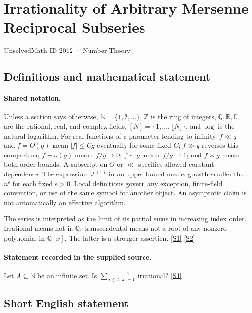 \documentclass[11pt,a4paper]{article}
\newcommand{\N}{\mathbb{N}}
\newcommand{\Z}{\mathbb{Z}}
\newcommand{\Q}{\mathbb{Q}}
\newcommand{\R}{\mathbb{R}}
\newcommand{\C}{\mathbb{C}}
\newcommand{\sref}[2]{\hyperlink{source:#1:#2}{[S#2]}}
\begin{document}

\setcounter{section}{2011}

\section{Irrationality of Arbitrary Mersenne Reciprocal Subseries}\label{2012}

{\small\sffamily UnsolvedMath ID 2012 · Number Theory}

\subsection{Definitions and mathematical statement}

\paragraph{Shared notation.}Unless a section says otherwise, $\N=\{1,2,\ldots\}$,
$\Z$ is the ring of integers, $\Q,\R,\C$ are the rational, real, and complex
fields, $[N]=\{1,\ldots,\lfloor N\rfloor\}$, and $\log$ is the natural
logarithm. For real functions of a parameter tending to infinity,
$f\ll g$ and $f=O(g)$ mean $|f|\leq Cg$ eventually for some fixed $C$;
$f\gg g$ reverses this comparison; $f=o(g)$ means $f/g\to0$;
$f\sim g$ means $f/g\to1$; and $f\asymp g$ means both order bounds.
A subscript on $O$ or $\ll$ specifies allowed constant dependence.
The expression $n^{o(1)}$ in an upper bound means growth smaller than
$n^\epsilon$ for each fixed $\epsilon>0$. Local definitions govern any
exception, finite-field convention, or use of the same symbol for another
object. An asymptotic claim is not automatically an effective algorithm.



The series is interpreted as the limit of its partial sums in increasing index order. Irrational means not in $\Q$; transcendental means not a root of any nonzero polynomial in $\Q[x]$. The latter is a stronger assertion. \sref{2012}{1} \sref{2012}{2}

\paragraph{Statement recorded in the supplied source.}
Let $A\subseteq \mathbb{N}$ be an infinite set. Is $ \sum_{n\in A}\frac{1}{2^n-1} $ irrational? \sref{2012}{1}

\subsection{Short English statement}
\end{document}
